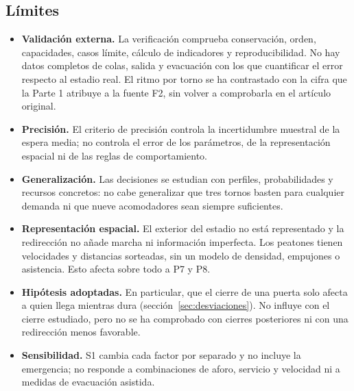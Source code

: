 \subsection{Límites}

\begin{itemize}
  \item \textbf{Validación externa.} La verificación comprueba conservación,
    orden, capacidades, casos límite, cálculo de indicadores y reproducibilidad.
    No hay datos completos de colas, salida y evacuación con los que cuantificar
    el error respecto al estadio real. El ritmo por torno se ha contrastado con la
    cifra que la Parte 1 atribuye a la fuente F2, sin volver a comprobarla en el
    artículo original.
  \item \textbf{Precisión.} El criterio de precisión controla la incertidumbre
    muestral de la espera media; no controla el error de los parámetros, de la
    representación espacial ni de las reglas de comportamiento.
  \item \textbf{Generalización.} Las decisiones se estudian con perfiles,
    probabilidades y recursos concretos: no cabe generalizar que tres tornos
    basten para cualquier demanda ni que nueve acomodadores sean siempre
    suficientes.
  \item \textbf{Representación espacial.} El exterior del estadio no está
    representado y la redirección no añade marcha ni información imperfecta.
    Los peatones tienen velocidades y distancias sorteadas, sin un modelo de
    densidad, empujones o asistencia. Esto afecta sobre todo a P7 y P8.
  \item \textbf{Hipótesis adoptadas.} En particular, que el cierre de una puerta
    solo afecta a quien llega mientras dura (sección~\ref{sec:desviaciones}).
    No influye con el cierre estudiado, pero no se ha comprobado con cierres
    posteriores ni con una redirección menos favorable.
  \item \textbf{Sensibilidad.} S1 cambia cada factor por separado y no incluye la
    emergencia; no responde a combinaciones de aforo, servicio y velocidad ni a
    medidas de evacuación asistida.
\end{itemize}
